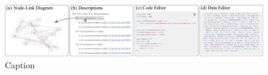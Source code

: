 \begin{figure}[ht]
    \centering
    \includegraphics[width=2\columnwidth]{figures/interface.eps}
    \caption{Caption}
    \label{fig:interface}
\end{figure}